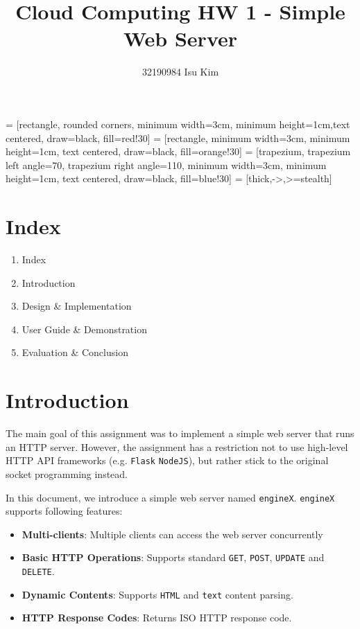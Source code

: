 \documentclass{homework}
\begin{document}
\title{Cloud Computing HW 1 - Simple Web Server}
\author{32190984 Isu Kim}
\maketitle

\newenvironment{code}{\captionsetup{type=listing}}{}

 = [rectangle, rounded corners, minimum width=3cm, minimum height=1cm,text centered, draw=black, fill=red!30]
 = [rectangle, minimum width=3cm, minimum height=1cm, text centered, draw=black, fill=orange!30]
 = [trapezium, trapezium left angle=70, trapezium right angle=110, minimum width=3cm, minimum height=1cm, text centered, draw=black, fill=blue!30]
 = [thick,->,>=stealth]

\maketitle
\pagebreak

\section{Index}
\begin{enumerate}
   \item Index
   \item Introduction
   \item Design \& Implementation
   \item User Guide \& Demonstration
   \item Evaluation \& Conclusion
\end{enumerate}
 
\section{Introduction}
The main goal of this assignment was to implement a simple web server that runs an HTTP server. However, the assignment has a restriction not to use high-level HTTP API frameworks (e.g. \texttt{Flask} \texttt{NodeJS}), but rather stick to the original socket programming instead. 

In this document, we introduce a simple web server named \texttt{engineX}. \texttt{engineX} supports following features:

\begin{itemize}
    \item \textbf{Multi-clients}: Multiple clients can access the web server concurrently
    \item \textbf{Basic HTTP Operations}: Supports standard \texttt{GET}, \texttt{POST}, \texttt{UPDATE} and \texttt{DELETE}.
    \item \textbf{Dynamic Contents}: Supports \texttt{HTML} and \texttt{text} content parsing.
    \item \textbf{HTTP Response Codes}: Returns ISO HTTP response code.
\end{itemize}
\end{document}
